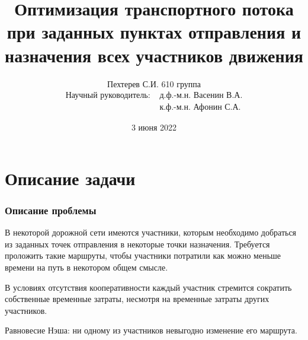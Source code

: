 \documentclass{beamer}
\begin{document}
\title{Оптимизация транспортного потока при заданных пунктах отправления и назначения всех участников движения}
\author{Пехтерев С.И. 610 группа
	\begin{align*}
		\text{Научный руководитель:} & \text{ д.ф.-м.н. Васенин В.А.} \\
		\text{} & \text{ к.ф.-м.н. Афонин С.А.}
	\end{align*}}
\date[03.06.2022]{3 июня 2022}

\maketitle



\section{Описание задачи}

\begin{frame}\frametitle{Описание проблемы}
	В некоторой дорожной сети имеются участники, которым необходимо добраться из заданных точек отправления в некоторые точки назначения. Требуется проложить такие маршруты, чтобы участники потратили как можно меньше времени на путь в некотором общем смысле.
	
	\bigskip
	В условиях отсутствия кооперативности каждый участник стремится сократить собственные временные затраты, несмотря на временные затраты других участников.
	
	\bigskip
	Равновесие Нэша: ни одному из участников невыгодно изменение его маршрута.
	
\end{frame}
\end{document}
